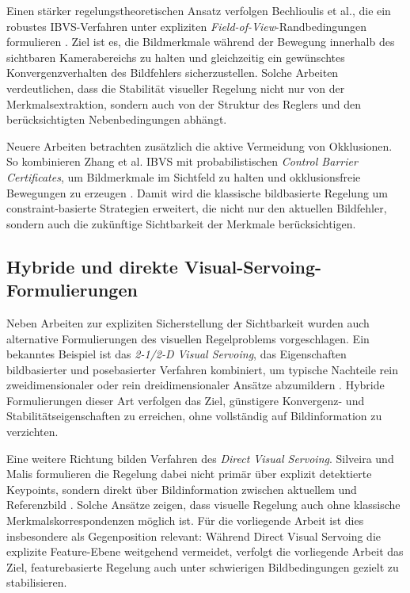 Einen stärker regelungstheoretischen Ansatz verfolgen Bechlioulis et al., die ein robustes \ac{IBVS}-Verfahren unter expliziten \textit{Field-of-View}-Randbedingungen formulieren \cite{bechlioulis2019robust}. Ziel ist es, die Bildmerkmale während der Bewegung innerhalb des sichtbaren Kamerabereichs zu halten und gleichzeitig ein gewünschtes Konvergenzverhalten des Bildfehlers sicherzustellen. Solche Arbeiten verdeutlichen, dass die Stabilität visueller Regelung nicht nur von der Merkmalsextraktion, sondern auch von der Struktur des Reglers und den berücksichtigten Nebenbedingungen abhängt.

Neuere Arbeiten betrachten zusätzlich die aktive Vermeidung von Okklusionen. So kombinieren Zhang et al. \ac{IBVS} mit probabilistischen \textit{Control Barrier Certificates}, um Bildmerkmale im Sichtfeld zu halten und okklusionsfreie Bewegungen zu erzeugen \cite{zhang2023occlusionfree}. Damit wird die klassische bildbasierte Regelung um constraint-basierte Strategien erweitert, die nicht nur den aktuellen Bildfehler, sondern auch die zukünftige Sichtbarkeit der Merkmale berücksichtigen.

\subsection{Hybride und direkte Visual-Servoing-Formulierungen}
\label{subsec:hybrid_direct_vs_related}

Neben Arbeiten zur expliziten Sicherstellung der Sichtbarkeit wurden auch alternative Formulierungen des visuellen Regelproblems vorgeschlagen. Ein bekanntes Beispiel ist das \textit{2-1/2-D Visual Servoing}, das Eigenschaften bildbasierter und posebasierter Verfahren kombiniert, um typische Nachteile rein zweidimensionaler oder rein dreidimensionaler Ansätze abzumildern \cite{malis1999twoandhalf}. Hybride Formulierungen dieser Art verfolgen das Ziel, günstigere Konvergenz- und Stabilitätseigenschaften zu erreichen, ohne vollständig auf Bildinformation zu verzichten.

Eine weitere Richtung bilden Verfahren des \textit{Direct Visual Servoing}. Silveira und Malis formulieren die Regelung dabei nicht primär über explizit detektierte Keypoints, sondern direkt über Bildinformation zwischen aktuellem und Referenzbild \cite{silveira2012direct}. Solche Ansätze zeigen, dass visuelle Regelung auch ohne klassische Merkmalskorrespondenzen möglich ist. Für die vorliegende Arbeit ist dies insbesondere als Gegenposition relevant: Während Direct Visual Servoing die explizite Feature-Ebene weitgehend vermeidet, verfolgt die vorliegende Arbeit das Ziel, featurebasierte Regelung auch unter schwierigen Bildbedingungen gezielt zu stabilisieren.


